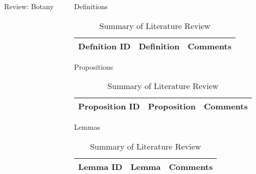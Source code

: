 \begin{frame}[t]
\begin{columns}[t]
\begin{column}{\onecolwid}
\begin{alertblock}{Review: Botany}
\end{alertblock}

\end{column}

\begin{column}{\onecolwid} %
\begin{alertblock}{Definitions}

\begin{table}[H]
	\centering
	\begin{tabular}{r|p{12cm}|l}
	\hline
	Defnition ID  & Definition & Comments \\
	\hline
	\hline
	\end{tabular}
	\caption{Summary of Literature Review}
\end{table} 


\end{alertblock}
\begin{alertblock}{Propositions}

\begin{table}[H]
	\centering
	\begin{tabular}{r|p{12cm}|l}
	\hline
	Proposition ID  & Proposition & Comments \\
	\hline
	\hline
	\end{tabular}
	\caption{Summary of Literature Review}
\end{table} 


\end{alertblock}
\begin{alertblock}{Lemmas}

\begin{table}[H]
	\centering
	\begin{tabular}{r|p{12cm}|l}
	\hline
	Lemma ID  & Lemma & Comments \\
	\hline
	\hline
	\end{tabular}
	\caption{Summary of Literature Review}
\end{table} 



\end{alertblock}
\end{column}
\end{columns}
\end{frame}
